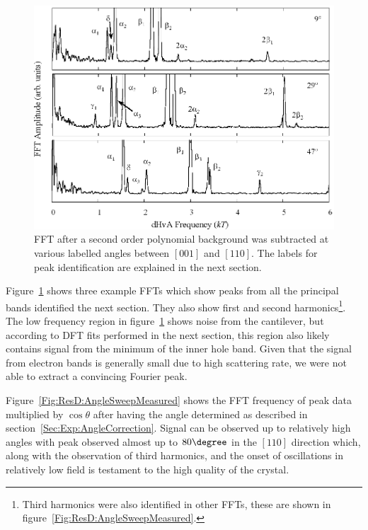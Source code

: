 \begin{figure}[htbp]
    \begin{center}
        \includegraphics[scale=0.9]{Chapter-dHvABaFe2P2/Figures/AngleDepMeasurements/FFTExamples/FFTExamples}
        \caption{\ac{FFT} after a second order polynomial background was subtracted at various labelled angles between $[001]$ and $[110]$. The labels for peak identification are explained in the next section.}
        \label{Fig:ResD:FFTExamples}
    \end{center}
\end{figure}

Figure~\ref{Fig:ResD:FFTExamples} shows three example \acp{FFT} which show peaks from all the principal bands identified the next section. They also show first and second harmonics\footnote{Third harmonics were also identified in other \acp{FFT}, these are shown in figure~\ref{Fig:ResD:AngleSweepMeasured}.}. The low frequency region in figure~\ref{Fig:ResD:FFTExamples} shows noise from the cantilever, but according to \ac{DFT} fits performed in the next section, this region also likely contains signal from the minimum of the inner hole band. Given that the signal from electron bands is generally small due to high scattering rate, we were not able to extract a convincing Fourier peak.

Figure~\ref{Fig:ResD:AngleSweepMeasured} shows the \ac{FFT} frequency of peak data multiplied by $\cos\theta$ after having the angle determined as described in section~\ref{Sec:Exp:AngleCorrection}.  Signal can be observed up to relatively high angles with peak observed almost up to $80\degree$ in the $[110]$ direction which, along with the observation of third harmonics, and the onset of oscillations in relatively low field is testament to the high quality of the crystal.

